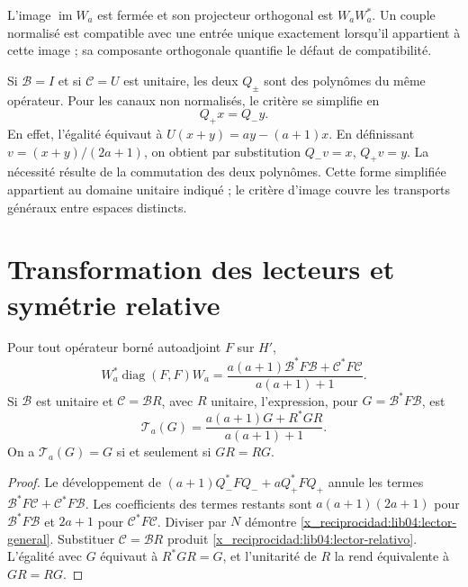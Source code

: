 L’image \(\operatorname{im}W_a\) est fermée et son projecteur
orthogonal est \(W_aW_a^*\). Un couple normalisé est compatible avec une
entrée unique exactement lorsqu’il appartient à cette image ; sa composante
orthogonale quantifie le défaut de compatibilité.

Si \(\mathcal B=I\) et si \(\mathcal C=U\) est unitaire, les deux
\(Q_\pm\) sont des polynômes du même opérateur. Pour les canaux non
normalisés, le critère se simplifie en
\begin{equation}
 Q_+x=Q_-y.
 \label{x_reciprocidad:lib04:compatibilidad-unitaria}
\end{equation}
En effet, l’égalité équivaut à
\(U(x+y)=ay-(a+1)x\). En définissant
\(v=(x+y)/(2a+1)\), on obtient par substitution
\(Q_-v=x\), \(Q_+v=y\). La nécessité résulte de la commutation
des deux polynômes. Cette forme simplifiée appartient au domaine
unitaire indiqué ; le critère d’image couvre les transports
généraux entre espaces distincts.

\section{Transformation des lecteurs et symétrie relative}
\label{x_reciprocidad:lib04:lectores}

\begin{theorem}
\label{x_reciprocidad:lib04:teo-lector}
Pour tout opérateur borné autoadjoint \(F\) sur \(H'\),
\begin{equation}
 W_a^*\operatorname{diag}(F,F)W_a
 =\frac{a(a+1)\mathcal B^*F\mathcal B+
                  \mathcal C^*F\mathcal C}{a(a+1)+1}.
 \label{x_reciprocidad:lib04:lector-general}
\end{equation}
Si \(\mathcal B\) est unitaire et \(\mathcal C=\mathcal BR\), avec \(R\) unitaire, l'expression, pour \(G=\mathcal B^*F\mathcal B\), est
\begin{equation}
 \mathcal T_a(G)=\frac{a(a+1)G+R^*GR}{a(a+1)+1}.
 \label{x_reciprocidad:lib04:lector-relativo}
\end{equation}
On a \(\mathcal T_a(G)=G\) si et seulement si \(GR=RG\).
\end{theorem}

\begin{proof}
Le développement de \((a+1)Q_-^*FQ_-+aQ_+^*FQ_+\) annule les termes \(\mathcal B^*F\mathcal C+\mathcal C^*F\mathcal B\). Les coefficients des termes restants sont \(a(a+1)(2a+1)\) pour \(\mathcal B^*F\mathcal B\) et \(2a+1\) pour \(\mathcal C^*F\mathcal C\). Diviser par \(N\) démontre \eqref{x_reciprocidad:lib04:lector-general}. Substituer \(\mathcal C=\mathcal BR\) produit \eqref{x_reciprocidad:lib04:lector-relativo}. L'égalité avec \(G\) équivaut à \(R^*GR=G\), et l'unitarité de \(R\) la rend équivalente à \(GR=RG\).
\end{proof}

